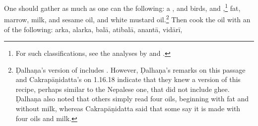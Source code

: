 \begin{translation}
One should gather as much as one can the following: a , %
 and  birds, and
,\footnote{For such
    classifications, see the analyses by \citet{zimm-1999} and \citet{smit-1994}.}
    fat, marrow, milk, and sesame oil, and white mustard oil.\footnote{Ḍalhaṇa's
        version of  includes . However, 
        Ḍalhaṇa's
        remarks on this passage and Cakrapāṇidatta's on 1.16.18 \citep[130]{acar-1939}
        indicate that they knew a version of this recipe, perhaps similar to the Nepalese
        one, that did not include ghee. Ḍalhaṇa also noted that others simply read four
        oils, beginning with fat and without milk, whereas Cakrapāṇidatta said that some
        say it is made with four oils and milk.}
Then cook the oil with an  of the
        following: \gls{arka}, %
        \gls{alarka}, %
        \gls{balā}, %
        \gls{atibalā}, %
        \gls{anantā}, %
        \gls{vidārī}, %

\end{translation}
